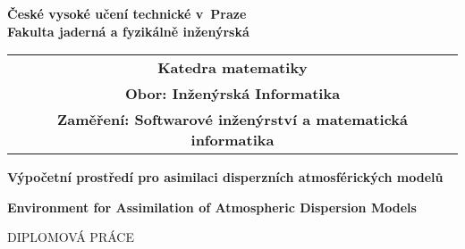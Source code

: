 \newcommand{\cvut}{České vysoké učení technické v~Praze}
\newcommand{\fjfi}{Fakulta jaderná a fyzikálně inženýrská}
\newcommand{\km}{Katedra matematiky}
\newcommand{\obor}{Inženýrská Informatika}
\newcommand{\zamereni}{Softwarové inženýrství a matematická informatika}

\newcommand{\nazevcz}{Výpočetní prostředí pro asimilaci disperzních atmosférických modelů}
\newcommand{\nazeven}{Environment for Assimilation of Atmospheric Dispersion Models}
\newcommand{\autor}{Matěj Laitl}
\newcommand{\rok}{2014}
\newcommand{\vedouci}{Ing. Václav Šmídl, Ph.D.}

\newcommand{\pracovisteVed}{Oddělení adaptivních systémů \\
	Ústav teorie informace a automatizace \\
	Akademie věd České republiky}
\newcommand{\konzultant}{}
\newcommand{\pracovisteKonz}{}

\newcommand{\klicova}{TODO asimilace, Bayesovská filtrace, sekvenční Monte Carlo, radioaktivní únik}
\newcommand{\keyword}{TODO assimilation, Bayesian estimation, sequential Monte Carlo, radioactive
release}
\newcommand{\abstrCZ}{TODO.}
\newcommand{\abstrEN}{TODO.}


\thispagestyle{empty}

\begin{center}
	{\Large  \bf  \cvut\\[2mm] \fjfi }
	\vspace{10mm}

	\begin{tabular}{c}
	{\bf \km}\\
	{\bf Obor: \obor}\\
	{\bf Zaměření: \zamereni}
	\end{tabular}

	\vspace{10mm} \epsfysize=20mm   \vspace{15mm}

	{\LARGE
	\textbf{\nazevcz}
	\par}

	\vspace{5mm}

	{\LARGE
	\textbf{\nazeven}
	\par}

	\vspace{30mm}
	{\Large DIPLOMOVÁ PRÁCE}

\end{center}

